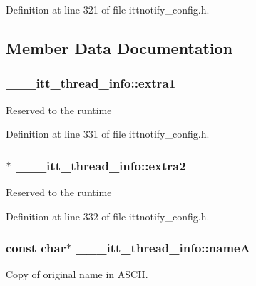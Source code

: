 Definition at line 321 of file ittnotify\-\_\-config.\-h.



\subsection{Member Data Documentation}
\hypertarget{struct______itt__thread__info_a24093b12fcbe313abcf61c449d42d66c}{
\subsubsection[{extra1}]{ \-\_\-\-\_\-\-\_\-itt\-\_\-thread\-\_\-info\-::extra1}}\label{struct______itt__thread__info_a24093b12fcbe313abcf61c449d42d66c}
Reserved to the runtime 

Definition at line 331 of file ittnotify\-\_\-config.\-h.

\hypertarget{struct______itt__thread__info_a29a043e53a66cc89b62b11f0ad8e7588}{
\subsubsection[{extra2}]{$\ast$ \-\_\-\-\_\-\-\_\-itt\-\_\-thread\-\_\-info\-::extra2}}\label{struct______itt__thread__info_a29a043e53a66cc89b62b11f0ad8e7588}
Reserved to the runtime 

Definition at line 332 of file ittnotify\-\_\-config.\-h.

\hypertarget{struct______itt__thread__info_af0d071b9ab2b86c040a6de800f92cb30}{
\subsubsection[{name\-A}]{\setlength{\rightskip}{0pt plus 5cm}const char$\ast$ \-\_\-\-\_\-\-\_\-itt\-\_\-thread\-\_\-info\-::name\-A}}\label{struct______itt__thread__info_af0d071b9ab2b86c040a6de800f92cb30}
Copy of original name in A\-S\-C\-I\-I. 

